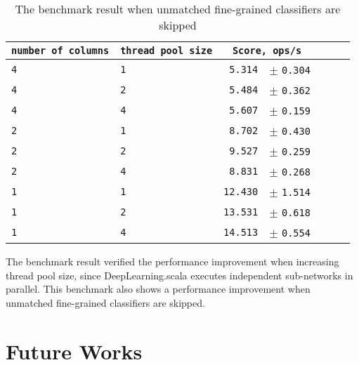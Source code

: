 \begin{table}[htbp]
  \begin{tabular}{l|l|l|l|l|rl}
  \texttt{number of columns} & \texttt{thread pool size} & \multicolumn{2}{c}{\texttt{Score, ops/s}} \\
  \hline
  \texttt{4} & \texttt{1} & \texttt{ 5.314} & \scriptsize $\pm$ \texttt{0.304}  \\
  \texttt{4} & \texttt{2} & \texttt{ 5.484} & \scriptsize $\pm$ \texttt{0.362}  \\
  \texttt{4} & \texttt{4} & \texttt{ 5.607} & \scriptsize $\pm$ \texttt{0.159}  \\
  \texttt{2} & \texttt{1} & \texttt{ 8.702} & \scriptsize $\pm$ \texttt{0.430}  \\
  \texttt{2} & \texttt{2} & \texttt{ 9.527} & \scriptsize $\pm$ \texttt{0.259}  \\
  \texttt{2} & \texttt{4} & \texttt{ 8.831} & \scriptsize $\pm$ \texttt{0.268}  \\
  \texttt{1} & \texttt{1} & \texttt{12.430} & \scriptsize $\pm$ \texttt{1.514}  \\
  \texttt{1} & \texttt{2} & \texttt{13.531} & \scriptsize $\pm$ \texttt{0.618}  \\
  \texttt{1} & \texttt{4} & \texttt{14.513} & \scriptsize $\pm$ \texttt{0.554}  \\
  \end{tabular}
  \caption{The benchmark result when unmatched fine-grained classifiers are skipped}
  \label{benchmark-skip-fine-grained}
\end{table}

The benchmark result verified the performance improvement when increasing thread pool size, since DeepLearning.scala executes independent sub-networks in parallel. This benchmark also shows a performance improvement when unmatched fine-grained classifiers are skipped.

\section{Future Works}

